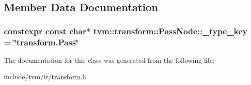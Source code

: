 \subsection{Member Data Documentation}
\subsubsection[{\texorpdfstring{\+\_\+type\+\_\+key}{_type_key}}]{\setlength{\rightskip}{0pt plus 5cm}constexpr const char$\ast$ tvm\+::transform\+::\+Pass\+Node\+::\+\_\+type\+\_\+key = \char`\"{}transform.\+Pass\char`\"{}\hspace{0.3cm}{\ttfamily [static]}}\hypertarget{classtvm_1_1transform_1_1PassNode_a4e95f892a77bfa9173892e88b032a4a8}{}\label{classtvm_1_1transform_1_1PassNode_a4e95f892a77bfa9173892e88b032a4a8}


The documentation for this class was generated from the following file\+:\begin{DoxyCompactItemize}
\item 
include/tvm/ir/\hyperlink{include_2tvm_2ir_2transform_8h}{transform.\+h}\end{DoxyCompactItemize}
